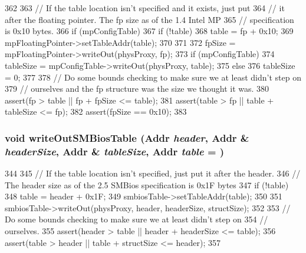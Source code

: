 \begin{DoxyCode}
362 {
363     // If the table location isn't specified and it exists, just put
364     // it after the floating pointer. The fp size as of the 1.4 Intel MP
365     // specification is 0x10 bytes.
366     if (mpConfigTable) {
367         if (!table)
368             table = fp + 0x10;
369         mpFloatingPointer->setTableAddr(table);
370     }
371 
372     fpSize = mpFloatingPointer->writeOut(physProxy, fp);
373     if (mpConfigTable)
374         tableSize = mpConfigTable->writeOut(physProxy, table);
375     else
376         tableSize = 0;
377 
378     // Do some bounds checking to make sure we at least didn't step on
379     // ourselves and the fp structure was the size we thought it was.
380     assert(fp > table || fp + fpSize <= table);
381     assert(table > fp || table + tableSize <= fp);
382     assert(fpSize == 0x10);
383 }
\end{DoxyCode}
\hypertarget{classX86System_aedc3044b917a61fa913215abf8d2840a}{
\subsubsection[{writeOutSMBiosTable}]{\setlength{\rightskip}{0pt plus 5cm}void writeOutSMBiosTable ({\bf Addr} {\em header}, \/  {\bf Addr} \& {\em headerSize}, \/  {\bf Addr} \& {\em tableSize}, \/  {\bf Addr} {\em table} = {})}}
\label{classX86System_aedc3044b917a61fa913215abf8d2840a}



\begin{DoxyCode}
344 {
345     // If the table location isn't specified, just put it after the header.
346     // The header size as of the 2.5 SMBios specification is 0x1F bytes
347     if (!table)
348         table = header + 0x1F;
349     smbiosTable->setTableAddr(table);
350 
351     smbiosTable->writeOut(physProxy, header, headerSize, structSize);
352 
353     // Do some bounds checking to make sure we at least didn't step on
354     // ourselves.
355     assert(header > table || header + headerSize <= table);
356     assert(table > header || table + structSize <= header);
357 }
\end{DoxyCode}


